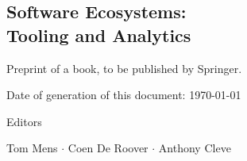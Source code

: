 % 
%
%

\begin{partbacktext}
\part*{Software Ecosystems:\\ Tooling and Analytics}
\label{part:title}

{\Large Preprint of  a book, to be published by Springer.}

\smallskip
{\large Date of generation of this document: \today}

\bigskip
{\huge Editors}

\smallskip
{\LARGE Tom Mens $\cdot$ Coen De Roover $\cdot$ Anthony Cleve}


\end{partbacktext}